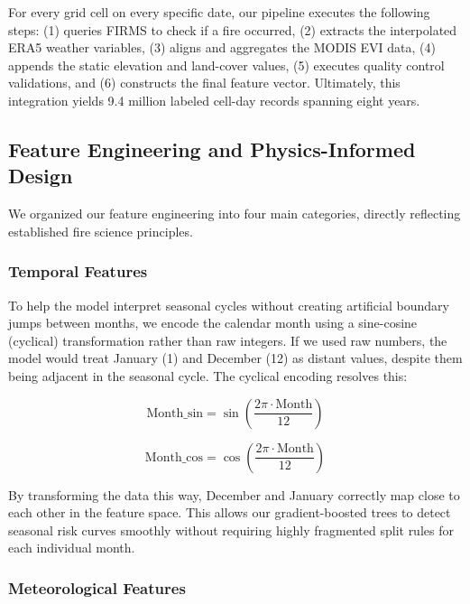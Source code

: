 For every grid cell on every specific date, our pipeline executes the following steps: (1) queries FIRMS to check if a fire occurred, (2) extracts the interpolated ERA5 weather variables, (3) aligns and aggregates the MODIS EVI data, (4) appends the static elevation and land-cover values, (5) executes quality control validations, and (6) constructs the final feature vector. Ultimately, this integration yields 9.4 million labeled cell-day records spanning eight years.

\subsection{Feature Engineering and Physics-Informed Design}

We organized our feature engineering into four main categories, directly reflecting established fire science principles.

\subsubsection{Temporal Features}

To help the model interpret seasonal cycles without creating artificial boundary jumps between months, we encode the calendar month using a sine-cosine (cyclical) transformation rather than raw integers. If we used raw numbers, the model would treat January (1) and December (12) as distant values, despite them being adjacent in the seasonal cycle. The cyclical encoding resolves this:

\begin{equation}
\text{Month\_sin} = \sin\left(\frac{2\pi \cdot \text{Month}}{12}\right)
\end{equation}

\begin{equation}
\text{Month\_cos} = \cos\left(\frac{2\pi \cdot \text{Month}}{12}\right)
\end{equation}

By transforming the data this way, December and January correctly map close to each other in the feature space. This allows our gradient-boosted trees to detect seasonal risk curves smoothly without requiring highly fragmented split rules for each individual month.

\subsubsection{Meteorological Features}

